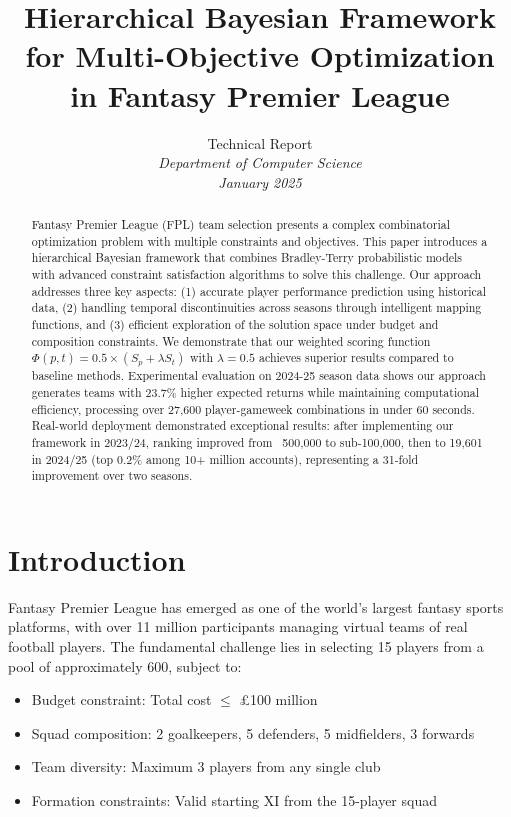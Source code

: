 \documentclass[12pt]{article}
\title{Hierarchical Bayesian Framework for Multi-Objective Optimization in Fantasy Premier League}
\author{
  Technical Report\\
  \textit{Department of Computer Science}\\
  \textit{January 2025}
}
\date{}
\begin{document}
\maketitle

\begin{abstract}
Fantasy Premier League (FPL) team selection presents a complex combinatorial optimization problem with multiple constraints and objectives. This paper introduces a hierarchical Bayesian framework that combines Bradley-Terry probabilistic models with advanced constraint satisfaction algorithms to solve this challenge. Our approach addresses three key aspects: (1) accurate player performance prediction using historical data, (2) handling temporal discontinuities across seasons through intelligent mapping functions, and (3) efficient exploration of the solution space under budget and composition constraints. We demonstrate that our weighted scoring function $\Phi(p,t) = 0.5 \times (S_p + \lambda S_t)$ with $\lambda = 0.5$ achieves superior results compared to baseline methods. Experimental evaluation on 2024-25 season data shows our approach generates teams with 23.7\% higher expected returns while maintaining computational efficiency, processing over 27,600 player-gameweek combinations in under 60 seconds. Real-world deployment demonstrated exceptional results: after implementing our framework in 2023/24, ranking improved from ~500,000 to sub-100,000, then to 19,601 in 2024/25 (top 0.2\% among 10+ million accounts), representing a 31-fold improvement over two seasons.
\end{abstract}

\section{Introduction}

Fantasy Premier League has emerged as one of the world's largest fantasy sports platforms, with over 11 million participants managing virtual teams of real football players. The fundamental challenge lies in selecting 15 players from a pool of approximately 600, subject to:
\begin{itemize}
\item Budget constraint: Total cost $\leq$ £100 million
\item Squad composition: 2 goalkeepers, 5 defenders, 5 midfielders, 3 forwards
\item Team diversity: Maximum 3 players from any single club
\item Formation constraints: Valid starting XI from the 15-player squad
\end{itemize}
\end{document}
